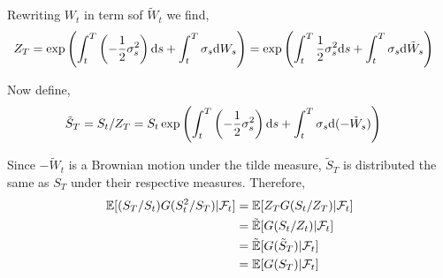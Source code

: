 \begin{solution}[Solution]
\begin{enumerate}[label=(\alph*)]
        Rewriting \( W_t \) in term sof \( \tilde{W}_t \) we find,
        \begin{align*}
            Z_T &= \exp \left( \int_{t}^{T} \left( -\frac{1}{2}\sigma_s^2 \right)\mathrm{d} s + \int_{t}^{T} \sigma_s \mathrm{d} W_s \right)
            = \exp \left( \int_{t}^{T} \frac{1}{2}\sigma_s^2 \mathrm{d} s + \int_{t}^{T} \sigma_s \mathrm{d} \tilde{W}_s \right)
        \end{align*}

        Now define,
        \begin{align*}
            \tilde{S}_T = S_t/Z_T &= S_t \exp \left( \int_{t}^{T} \left( -\frac{1}{2}\sigma_s^2 \right)\mathrm{d} s + \int_{t}^{T} \sigma_s \mathrm{d} (-\tilde{W}_s) \right)
        \end{align*}
       
        Since \( -\tilde{W}_t \) is a Brownian motion under the tilde measure, \( \tilde{S}_T \) is distributed the same as \( S_T \) under their respective measures. 
        Therefore,
        \begin{align*}
            \mathbb{E}[(S_T/S_t) G(S_t^2/S_T) | \mathcal{F}_t] 
            &= \mathbb{E}[Z_T G(S_t/Z_T) | \mathcal{F}_t] 
            \\&= \tilde{\mathbb{E}}[ G(S_t/Z_t) | \mathcal{F}_t] 
            \\&= \tilde{\mathbb{E}}[G(\tilde{S}_T) | \mathcal{F}_t]
            \\&= \mathbb{E}[G(S_T)|\mathcal{F}_t]
        \end{align*}
        
                



\end{enumerate}
\end{solution}


